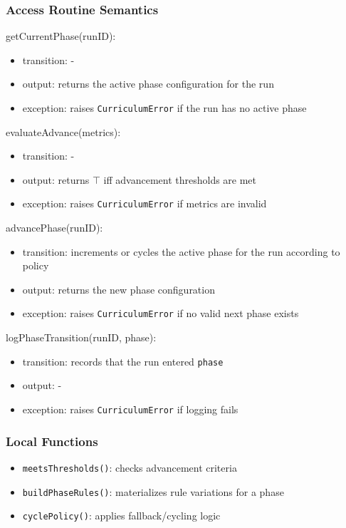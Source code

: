 \documentclass[12pt, titlepage]{article}
\begin{document}
\subsubsection{Access Routine Semantics}

\noindent getCurrentPhase(runID):
\begin{itemize}
\item transition: -
\item output: returns the active phase configuration for the run
\item exception: raises \texttt{CurriculumError} if the run has no active phase
\end{itemize}

\noindent evaluateAdvance(metrics):
\begin{itemize}
\item transition: -
\item output: returns $\top$ iff advancement thresholds are met
\item exception: raises \texttt{CurriculumError} if metrics are invalid
\end{itemize}

\noindent advancePhase(runID):
\begin{itemize}
\item transition: increments or cycles the active phase for the run according to policy
\item output: returns the new phase configuration
\item exception: raises \texttt{CurriculumError} if no valid next phase exists
\end{itemize}

\noindent logPhaseTransition(runID, phase):
\begin{itemize}
\item transition: records that the run entered \texttt{phase}
\item output: -
\item exception: raises \texttt{CurriculumError} if logging fails
\end{itemize}

\subsubsection{Local Functions}
\begin{itemize}
\item \texttt{meetsThresholds()}: checks advancement criteria
\item \texttt{buildPhaseRules()}: materializes rule variations for a phase
\item \texttt{cyclePolicy()}: applies fallback/cycling logic
\end{itemize}
\end{document}
